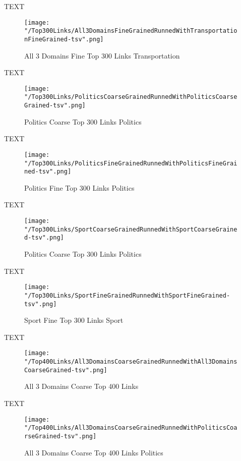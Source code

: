 \documentclass[thesis=M,english]{FITthesis}[2012/10/20]
\begin{document}
		TEXT	

	\begin{figure}\centering
		\texttt{[image: "/Top300Links/All3DomainsFineGrainedRunnedWithTransportationFineGrained-tsv".png]}
		\caption{All 3 Domains Fine Top 300 Links Transportation}\label{}	
	\end{figure}
	
	TEXT

	\begin{figure}\centering
		\texttt{[image: "/Top300Links/PoliticsCoarseGrainedRunnedWithPoliticsCoarseGrained-tsv".png]}
		\caption{Politics Coarse Top 300 Links Politics}\label{}
	\end{figure}	

	TEXT	

	\begin{figure}\centering
		\texttt{[image: "/Top300Links/PoliticsFineGrainedRunnedWithPoliticsFineGrained-tsv".png]}
		\caption{Politics Fine Top 300 Links Politics}\label{}
	\end{figure}

	
	TEXT

	\begin{figure}\centering
		\texttt{[image: "/Top300Links/SportCoarseGrainedRunnedWithSportCoarseGrained-tsv".png]}
		\caption{Politics Coarse Top 300 Links Politics}\label{}
	\end{figure}		
	
		TEXT	

	\begin{figure}\centering
		\texttt{[image: "/Top300Links/SportFineGrainedRunnedWithSportFineGrained-tsv".png]}
		\caption{Sport Fine Top 300 Links Sport}\label{}	
	\end{figure}

	TEXT

	\begin{figure}\centering
		\texttt{[image: "/Top400Links/All3DomainsCoarseGrainedRunnedWithAll3DomainsCoarseGrained-tsv".png]}
		\caption{All 3 Domains Coarse Top 400 Links}\label{}
	\end{figure}

	TEXT

	\begin{figure}\centering
		\texttt{[image: "/Top400Links/All3DomainsCoarseGrainedRunnedWithPoliticsCoarseGrained-tsv".png]}
		\caption{All 3 Domains Coarse Top 400 Links Politics}\label{}
	\end{figure}	
\end{document}
